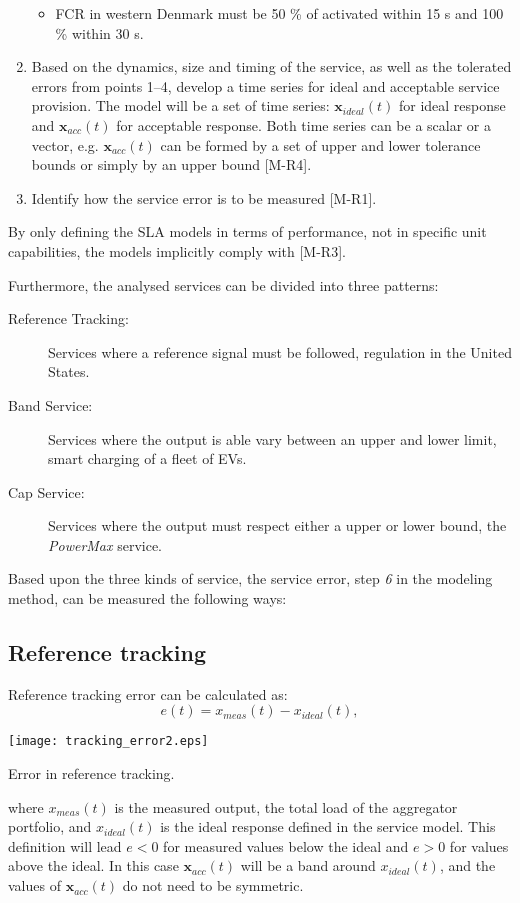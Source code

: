 \begin{enumerate}
\begin{itemize}
    \item \eg FCR in western Denmark must be 50 \% of activated within 15 s and 100 \% within 30 s.
  \end{itemize}
  \item Based on the dynamics, size and timing of the service, as well as the tolerated errors from points 1--4, develop a time series for ideal and acceptable service provision. The model will be a set of time series: $\mathbf{x}_{ideal}(t)$ for ideal response and $\mathbf{x}_{acc}(t)$ for acceptable response. Both time series can be a scalar or a vector, e.g. $\mathbf{x}_{acc}(t)$ can be formed by a set of upper and lower tolerance bounds or simply by an upper bound [M-R4].
  \item Identify how the service error is to be measured [M-R1].
\end{enumerate}
By only defining the SLA models in terms of performance, not in specific unit capabilities, the models implicitly comply with [M-R3].

Furthermore, the analysed services can be divided into three patterns:
\begin{description}
	\item[Reference Tracking:] Services where a reference signal must be followed, \eg regulation in the United States.
	\item[Band Service:] Services where the output is able vary between an upper and lower limit, \eg smart charging of a fleet of EVs.
	\item[Cap Service:] Services where the output must respect either a upper or lower bound, \eg the \emph{PowerMax} service.
\end{description}

Based upon the three kinds of service, the service error, \ie step \emph{6} in the modeling method, can be measured the following ways:
\subsection*{Reference tracking}

Reference tracking error can be calculated as:
\begin{equation}\label{MAINeq:ref_error}
e(t) = x_{meas}(t) - x_{ideal}(t),
\end{equation}
\begin{marginfigure}
	\texttt{[image: tracking\_error2.eps]}
	\caption{Error in reference tracking.}
      \label{fig:reftrackerrorMAIN}
\end{marginfigure}
where $x_{meas}(t)$ is the measured output, \eg the total load of the aggregator portfolio, and $x_{ideal}(t)$ is the ideal response defined in the service model. This definition will lead $e<0$ for measured values below the ideal and $e>0$ for values above the ideal. In this case $\mathbf{x}_{acc}(t)$ will be a band around $x_{ideal}(t)$, and the values of $\mathbf{x}_{acc}(t)$ do not need to be symmetric.

